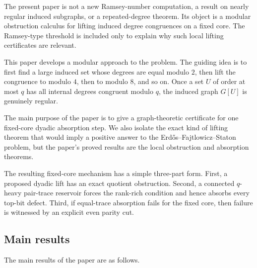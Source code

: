\documentclass[thmsec,dntnbr,nolinenbrs]{dmgt}
\numberwithin{equation}{section}
\begin{document}
The present paper is not a new Ramsey-number computation, a result on nearly regular induced subgraphs, or a repeated-degree theorem.  Its object is a modular obstruction calculus for lifting induced degree congruences on a fixed core.  The Ramsey-type threshold is included only to explain why such local lifting certificates are relevant.

This paper develops a modular approach to the problem.  The guiding idea is to first find a large induced set whose degrees are equal modulo \(2\), then lift the congruence to modulo \(4\), then to modulo \(8\), and so on.  Once a set \(U\) of order at most \(q\) has all internal degrees congruent modulo \(q\), the induced graph \(G[U]\) is genuinely regular.

The main purpose of the paper is to give a graph-theoretic certificate for one fixed-core dyadic absorption step.  We also isolate the exact kind of lifting theorem that would imply a positive answer to the Erd\H{o}s--Fajtlowicz--Staton problem, but the paper's proved results are the local obstruction and absorption theorems.

The resulting fixed-core mechanism has a simple three-part form.  First, a proposed dyadic lift has an exact quotient obstruction.  Second, a connected \(q\)-heavy pair-trace reservoir forces the rank-rich condition and hence absorbs every top-bit defect.  Third, if equal-trace absorption fails for the fixed core, then failure is witnessed by an explicit even parity cut.

\subsection{Main results}

The main results of the paper are as follows.
\end{document}
